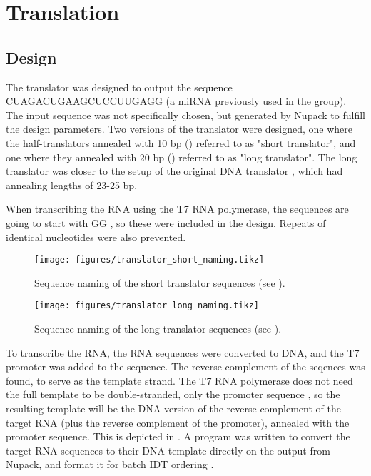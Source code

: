 \section{Translation}
\subsection{Design}
The translator was designed to output the sequence CUAGACUGAAGCUCCUUGAGG (a miRNA previously used in the group). The input sequence was not specifically chosen, but generated by Nupack \cite{Zadeh2011} to fulfill the design parameters. Two versions of the translator were designed, one where the half-translators annealed with 10 bp () referred to as "short translator", and one where they annealed with 20 bp () referred to as "long translator". The long translator was closer to the setup of the original DNA translator \cite{Picuri2009}, which had annealing lengths of 23-25 bp.

When transcribing the RNA using the T7 RNA polymerase, the sequences are going to start with GG \cite{Milligan1987}, so these were included in the design. Repeats of identical nucleotides were also prevented.


\begin{figure}[h]
\centering
\texttt{[image: figures/translator\_short\_naming.tikz]}
\caption{Sequence naming of the short translator sequences (see ).}
\label{translator_short_subunits}
\end{figure}


\begin{figure}[h]
\centering
\texttt{[image: figures/translator\_long\_naming.tikz]}
\caption{Sequence naming of the long translator sequences (see ).}
\label{translator_long_subunits}
\end{figure}

To transcribe the RNA, the RNA sequences were converted to DNA, and the T7 promoter was added to the sequence. The reverse complement of the seqences was found, to serve as the template strand. The T7 RNA polymerase does not need the full template to be double-stranded, only the promoter sequence \cite{Milligan1987}, so the resulting template will be the DNA version of the reverse complement of the target RNA (plus the reverse complement of the promoter), annealed with the promoter sequence. This is depicted in . A program was written to convert the target RNA sequences to their DNA template directly on the output from Nupack, and format it for batch IDT ordering \cite{nupackorder}.


